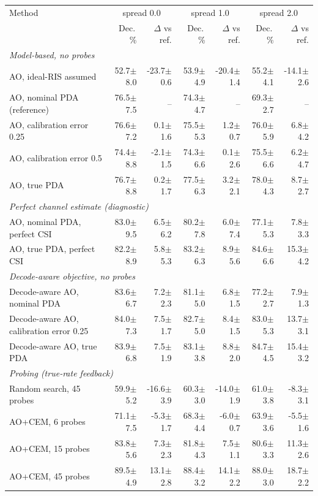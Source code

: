 \begin{tabular}{lrrrrrr}
\toprule
Method & \multicolumn{2}{c}{spread 0.0} & \multicolumn{2}{c}{spread 1.0} & \multicolumn{2}{c}{spread 2.0} \\
 & Dec.\,\% & $\Delta$ vs ref. & Dec.\,\% & $\Delta$ vs ref. & Dec.\,\% & $\Delta$ vs ref. \\
\midrule
\multicolumn{7}{l}{\emph{Model-based, no probes}} \\
AO, ideal-RIS assumed & 52.7$\pm$8.0 & -23.7$\pm$0.6 & 53.9$\pm$4.9 & -20.4$\pm$1.4 & 55.2$\pm$4.1 & -14.1$\pm$2.6 \\
AO, nominal PDA (reference) & 76.5$\pm$7.5 & -- & 74.3$\pm$4.7 & -- & 69.3$\pm$2.7 & -- \\
AO, calibration error 0.25 & 76.6$\pm$7.2 & 0.1$\pm$1.6 & 75.5$\pm$5.3 & 1.2$\pm$0.7 & 76.0$\pm$5.9 & 6.8$\pm$4.2 \\
AO, calibration error 0.5 & 74.4$\pm$8.8 & -2.1$\pm$1.5 & 74.3$\pm$6.6 & 0.1$\pm$2.6 & 75.5$\pm$6.6 & 6.2$\pm$4.7 \\
AO, true PDA & 76.7$\pm$8.8 & 0.2$\pm$1.7 & 77.5$\pm$6.3 & 3.2$\pm$2.1 & 78.0$\pm$4.3 & 8.7$\pm$2.7 \\
\midrule
\multicolumn{7}{l}{\emph{Perfect channel estimate (diagnostic)}} \\
AO, nominal PDA, perfect CSI & 83.0$\pm$9.5 & 6.5$\pm$6.2 & 80.2$\pm$7.8 & 6.0$\pm$7.4 & 77.1$\pm$5.3 & 7.8$\pm$3.3 \\
AO, true PDA, perfect CSI & 82.2$\pm$8.9 & 5.8$\pm$5.3 & 83.2$\pm$6.3 & 8.9$\pm$5.6 & 84.6$\pm$6.6 & 15.3$\pm$4.2 \\
\midrule
\multicolumn{7}{l}{\emph{Decode-aware objective, no probes}} \\
Decode-aware AO, nominal PDA & 83.6$\pm$6.7 & 7.2$\pm$2.3 & 81.1$\pm$5.0 & 6.8$\pm$1.5 & 77.2$\pm$2.7 & 7.9$\pm$1.3 \\
Decode-aware AO, calibration error 0.25 & 84.0$\pm$7.3 & 7.5$\pm$1.7 & 82.7$\pm$5.0 & 8.4$\pm$1.5 & 83.0$\pm$5.3 & 13.7$\pm$3.1 \\
Decode-aware AO, true PDA & 83.9$\pm$6.8 & 7.5$\pm$1.9 & 83.1$\pm$3.8 & 8.8$\pm$2.0 & 84.7$\pm$4.5 & 15.4$\pm$3.2 \\
\midrule
\multicolumn{7}{l}{\emph{Probing (true-rate feedback)}} \\
Random search, 45 probes & 59.9$\pm$5.2 & -16.6$\pm$3.9 & 60.3$\pm$3.0 & -14.0$\pm$1.9 & 61.0$\pm$3.8 & -8.3$\pm$3.1 \\
AO+CEM, 6 probes & 71.1$\pm$7.5 & -5.3$\pm$1.7 & 68.3$\pm$4.4 & -6.0$\pm$0.7 & 63.9$\pm$3.6 & -5.5$\pm$1.6 \\
AO+CEM, 15 probes & 83.8$\pm$5.6 & 7.3$\pm$2.3 & 81.8$\pm$4.3 & 7.5$\pm$1.1 & 80.6$\pm$3.3 & 11.3$\pm$2.6 \\
AO+CEM, 45 probes & 89.5$\pm$4.9 & 13.1$\pm$2.8 & 88.4$\pm$3.2 & 14.1$\pm$2.2 & 88.0$\pm$3.0 & 18.7$\pm$2.2 \\
\bottomrule
\end{tabular}
